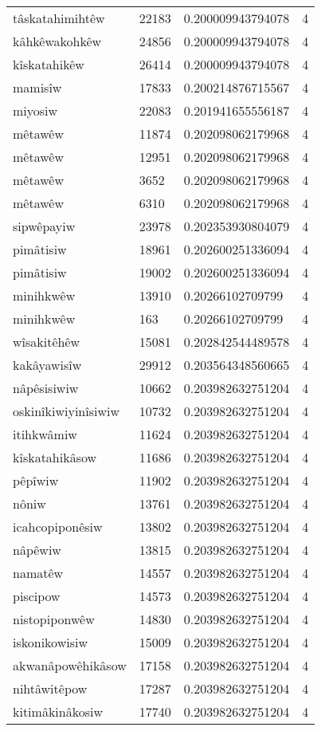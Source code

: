 \begin{longtable}{llll}
tâskatahimihtêw & 22183 & 0.200009943794078 & 4 \\
kâhkêwakohkêw & 24856 & 0.200009943794078 & 4 \\
kîskatahikêw & 26414 & 0.200009943794078 & 4 \\
mamisîw & 17833 & 0.200214876715567 & 4 \\
miyosiw & 22083 & 0.201941655556187 & 4 \\
mêtawêw & 11874 & 0.202098062179968 & 4 \\
mêtawêw & 12951 & 0.202098062179968 & 4 \\
mêtawêw & 3652 & 0.202098062179968 & 4 \\
mêtawêw & 6310 & 0.202098062179968 & 4 \\
sipwêpayiw & 23978 & 0.202353930804079 & 4 \\
pimâtisiw & 18961 & 0.202600251336094 & 4 \\
pimâtisiw & 19002 & 0.202600251336094 & 4 \\
minihkwêw & 13910 & 0.20266102709799 & 4 \\
minihkwêw & 163 & 0.20266102709799 & 4 \\
wîsakitêhêw & 15081 & 0.202842544489578 & 4 \\
kakâyawisîw & 29912 & 0.203564348560665 & 4 \\
nâpêsisiwiw & 10662 & 0.203982632751204 & 4 \\
oskinîkiwiyinîsiwiw & 10732 & 0.203982632751204 & 4 \\
itihkwâmiw & 11624 & 0.203982632751204 & 4 \\
kîskatahikâsow & 11686 & 0.203982632751204 & 4 \\
pêpîwiw & 11902 & 0.203982632751204 & 4 \\
nôniw & 13761 & 0.203982632751204 & 4 \\
icahcopiponêsiw & 13802 & 0.203982632751204 & 4 \\
nâpêwiw & 13815 & 0.203982632751204 & 4 \\
namatêw & 14557 & 0.203982632751204 & 4 \\
piscipow & 14573 & 0.203982632751204 & 4 \\
nistopiponwêw & 14830 & 0.203982632751204 & 4 \\
iskonikowisiw & 15009 & 0.203982632751204 & 4 \\
akwanâpowêhikâsow & 17158 & 0.203982632751204 & 4 \\
nihtâwitêpow & 17287 & 0.203982632751204 & 4 \\
kitimâkinâkosiw & 17740 & 0.203982632751204 & 4 \\

\end{longtable}
